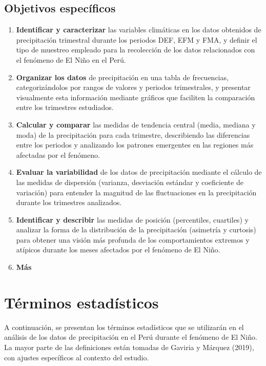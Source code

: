 \documentclass{article}
\begin{document}
\subsection{Objetivos específicos}

\begin{enumerate}
  \item \textbf{Identificar y caracterizar} las variables climáticas en los datos obtenidos de precipitación trimestral durante los periodos DEF, EFM y FMA, y definir el tipo de muestreo empleado para la recolección de los datos relacionados con el fenómeno de El Niño en el Perú.
  
  \item \textbf{Organizar los datos} de precipitación en una tabla de frecuencias, categorizándolos por rangos de valores y periodos trimestrales, y presentar visualmente esta información mediante gráficos que faciliten la comparación entre los trimestres estudiados.
  
  \item \textbf{Calcular y comparar} las medidas de tendencia central (media, mediana y moda) de la precipitación para cada trimestre, describiendo las diferencias entre los periodos y analizando los patrones emergentes en las regiones más afectadas por el fenómeno.
  
  \item \textbf{Evaluar la variabilidad} de los datos de precipitación mediante el cálculo de las medidas de dispersión (varianza, desviación estándar y coeficiente de variación) para entender la magnitud de las fluctuaciones en la precipitación durante los trimestres analizados.
  
  \item \textbf{Identificar y describir} las medidas de posición (percentiles, cuartiles) y analizar la forma de la distribución de la precipitación (asimetría y curtosis) para obtener una visión más profunda de los comportamientos extremos y atípicos durante los meses afectados por el fenómeno de El Niño.
  
  \item \textbf{Más}
\end{enumerate}

\newpage

\section{Términos estadísticos}

A continuación, se presentan los términos estadísticos que se utilizarán en el análisis de los datos de precipitación en el Perú durante el fenómeno de El Niño. La mayor parte de las definiciones están tomadas de Gaviria y Márquez (2019), con ajustes específicos al contexto del estudio.
\end{document}
